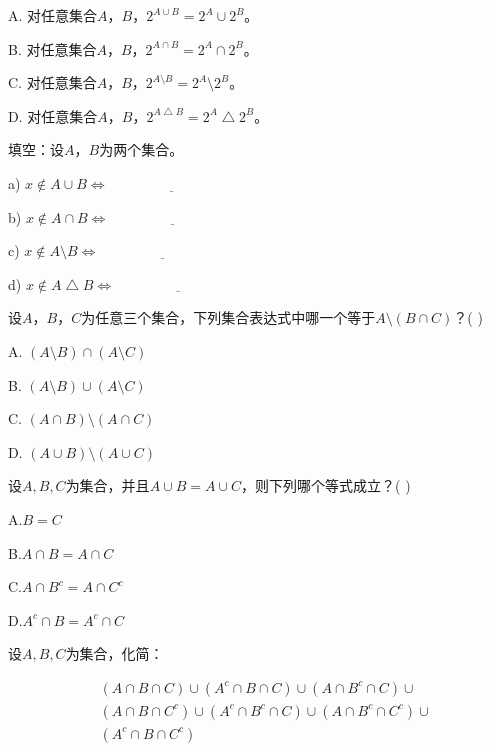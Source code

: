 \documentclass{article}
\begin{document}
\begin{CJK}{UTF8}{gbsn}
\begin{Exercise}
A. 对任意集合$A$，$B$，$2^{A\cup B} = 2^A \cup 2^B$。

B. 对任意集合$A$，$B$，$2^{A\cap B} = 2^A \cap 2^B$。

C. 对任意集合$A$，$B$，$2^{A\setminus B} = 2^A \setminus 2^B$。

D. 对任意集合$A$，$B$，$2^{A\bigtriangleup B} = 2^A \bigtriangleup 2^B$。

\end{Exercise}
\begin{Exercise}
  填空：设$A$，$B$为两个集合。

  a) $x\notin A\cup B\Leftrightarrow \underline{\quad\quad\quad\quad\quad\quad\quad\quad\quad}$

  b) $x\notin A\cap B\Leftrightarrow \underline{\quad\quad\quad\quad\quad\quad\quad\quad\quad}$

  c) $x\notin A\setminus B\Leftrightarrow \underline{\quad\quad\quad\quad\quad\quad\quad\quad\quad}$

  d) $x\notin A\bigtriangleup B\Leftrightarrow \underline{\quad\quad\quad\quad\quad\quad\quad\quad\quad}$
\end{Exercise}
\begin{Exercise}
  设$A$，$B$，$C$为任意三个集合，下列集合表达式中哪一个等于$A\setminus (B\cap C)$？(   )

  A. $(A\setminus B)\cap (A\setminus C)$

  B. $(A\setminus B)\cup (A\setminus C)$

  C. $(A\cap B)\setminus (A\cap C)$

  D. $(A\cup B)\setminus (A\cup C)$
\end{Exercise}


\begin{Exercise}
  设$A,B,C$为集合，并且$A\cup B=A\cup C$，则下列哪个等式成立？(  )

  A.$B=C$

  B.$A\cap B = A\cap C$

  C.$A\cap B^c = A\cap C^c$

  D.$A^c\cap B = A^c\cap C$
\end{Exercise}



\begin{Exercise}
  设$A,B,C$为集合，化简：

  \begin{equation*}
    \begin{split}
     & (A\cap B \cap C)\cup(A^c\cap B \cap C)\cup(A\cap B^c \cap C)\cup \\
     & (A\cap B \cap C^c)\cup(A^c\cap B^c \cap C)\cup(A\cap B^c \cap C^c)\cup \\
     & (A^c\cap B \cap C^c)
    \end{split}
  \end{equation*}
\end{Exercise}


\end{CJK}
\end{document}
